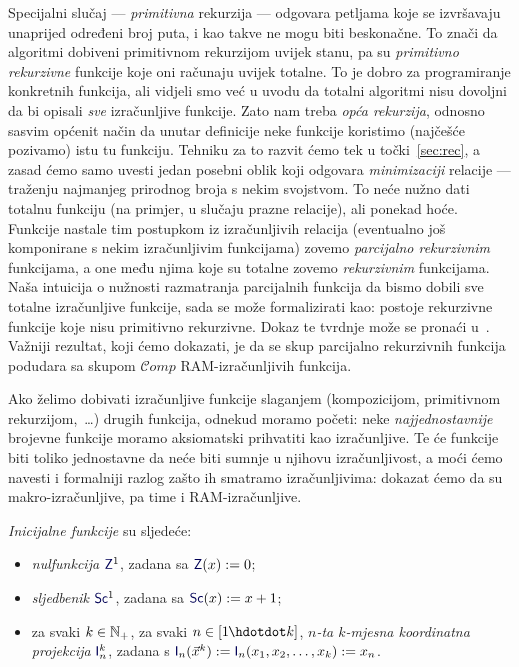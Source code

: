 Specijalni slučaj --- \emph{primitivna} rekurzija --- odgovara petljama koje se izvršavaju unaprijed određeni broj puta, i kao takve ne mogu biti beskonačne. To znači da algoritmi dobiveni primitivnom rekurzijom uvijek stanu, pa su \emph{primitivno rekurzivne} funkcije koje oni računaju uvijek totalne. To je dobro za programiranje konkretnih funkcija, ali vidjeli smo već u uvodu da totalni algoritmi nisu dovoljni da bi opisali \emph{sve} izračunljive funkcije. Zato nam treba \emph{opća rekurzija}, odnosno sasvim općenit način da unutar definicije neke funkcije koristimo (najčešće pozivamo) istu tu funkciju. Tehniku za to razvit ćemo tek u točki~\ref{sec:rec}, a zasad ćemo samo uvesti jedan posebni oblik koji odgovara \emph{minimizaciji} relacije --- traženju najmanjeg prirodnog broja s nekim svojstvom. To neće nužno dati totalnu funkciju (na primjer, u slučaju prazne relacije), ali ponekad hoće. Funkcije nastale tim postupkom iz izračunljivih relacija (eventualno još komponirane s nekim izračunljivim funkcijama) zovemo \emph{parcijalno rekurzivnim} funkcijama, a one među njima koje su totalne zovemo \emph{rekurzivnim} funkcijama. Naša intuicija o nužnosti razmatranja parcijalnih funkcija da bismo dobili sve totalne izračunljive funkcije, sada se može formalizirati kao: postoje rekurzivne funkcije koje nisu primitivno rekurzivne. Dokaz te tvrdnje može se pronaći u~\cite[dodatak]{skr:Vuk}. Važniji rezultat, koji ćemo dokazati, je da se skup parcijalno rekurzivnih funkcija podudara sa skupom $\mathscr Comp$ RAM-izračunljivih funkcija.


Ako želimo dobivati izračunljive funkcije slaganjem (kompozicijom, primitivnom rekurzijom,~\ldots) drugih funkcija, odnekud moramo početi: neke \emph{najjednostavnije} brojevne funkcije moramo aksiomatski prihvatiti kao izračunljive. Te će funkcije biti toliko jednostavne da neće biti sumnje u njihovu izračunljivost, a moći ćemo navesti i formalniji razlog zašto ih smatramo izračunljivima: dokazat ćemo da su makro-izračunljive, pa time i RAM-izračunljive.

\begin{definicija}[{name=[inicijalne funkcije]}]\label{def:init}
\emph{Inicijalne funkcije} su sljedeće:
\begin{itemize}
    \item \emph{nulfunkcija} $\f Z^1$, zadana sa $\f Z(x):=0$;
    \item \emph{sljedbenik} $\f{Sc}^1$, zadana sa $\f{Sc}(x):=x+1$;
    \item za svaki $k\in{\mathbb N}_+$, za svaki $n\in[1\mspace{-1mu}\dd k]$, \emph{$n$-ta $k$-mjesna koordinatna projekcija} $\f I_n^k$, zadana s $\f I_n(\vec x^k):=\f I_n(x_1,x_2,\dotsc,x_k):=x_n$.\qedhere
\end{itemize}
\end{definicija}

